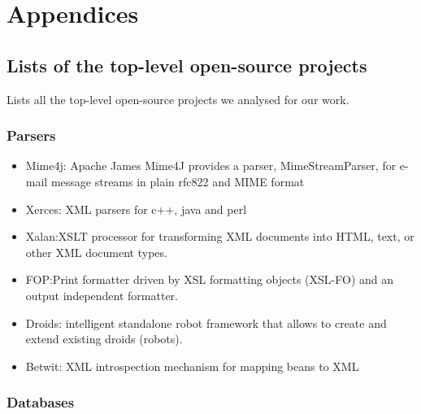 \documentclass[12pt]{report}
\providecommand{\tightlist}{%
  \setlength{\itemsep}{0pt}\setlength{\parskip}{0pt}}
\begin{document}
\chapter{Appendices}\label{appendices}

\section{Lists of the top-level open-source
projects}\label{lists-of-the-top-level-open-source-projects}

Lists all the top-level open-source projects we analysed for our work.

\subsection{Parsers}\label{parsers}

\begin{itemize}
\tightlist
\item
  Mime4j: Apache James Mime4J provides a parser, MimeStreamParser, for
  e-mail message streams in plain rfc822 and MIME format
\item
  Xerces: XML parsers for c++, java and perl
\item
  Xalan:XSLT processor for transforming XML documents into HTML, text,
  or other XML document types.
\item
  FOP:Print formatter driven by XSL formatting objects (XSL-FO) and an
  output independent formatter.
\item
  Droids: intelligent standalone robot framework that allows to create
  and extend existing droids (robots).
\item
  Betwit: XML introspection mechanism for mapping beans to XML
\end{itemize}

\subsection{Databases}\label{databases}
\end{document}
